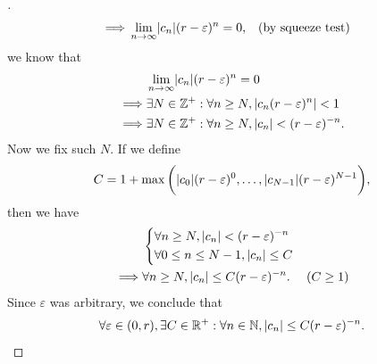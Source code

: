 \begin{proof}[]
\begin{align*}
    \implies & \lim_{n \to \infty} \abs{c_n} (r - \varepsilon)^n = 0,                                      &  & \text{(by squeeze test)}
  \end{align*}
  we know that
  \begin{align*}
             & \lim_{n \to \infty} \abs{c_n} (r - \varepsilon)^n = 0                      \\
    \implies & \exists N \in \Z^+ : \forall n \geq N, \abs{c_n (r - \varepsilon)^n} < 1   \\
    \implies & \exists N \in \Z^+ : \forall n \geq N, \abs{c_n} < (r - \varepsilon)^{-n}.
  \end{align*}
  Now we fix such \(N\).
  If we define
  \[
    C = 1 + \max\bigg(\abs{c_0} (r - \varepsilon)^0, \dots, \abs{c_{N - 1}} (r - \varepsilon)^{N - 1}\bigg),
  \]
  then we have
  \begin{align*}
             & \begin{dcases}
                 \forall n \geq N, \left\lvert c_n\right\rvert < (r - \varepsilon)^{-n} \\
                 \forall 0 \leq n \leq N - 1, \left\lvert c_n\right\rvert \leq C
               \end{dcases}                    \\
    \implies & \forall n \geq N, \left\lvert c_n\right\rvert \leq C (r - \varepsilon)^{-n}. & (C \geq 1)
  \end{align*}
  Since \(\varepsilon\) was arbitrary, we conclude that
  \[
    \forall \varepsilon \in (0, r), \exists C \in \mathbb{R}^+ : \forall n \in \mathbb{N}, \left\lvert c_n\right\rvert \leq C (r - \varepsilon)^{-n}.
  \]
\end{proof}

